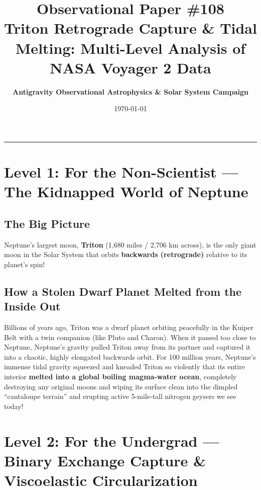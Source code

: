 \documentclass[11pt,a4paper]{article}
\title{\Huge \textbf{Observational Paper \#108}\\ \Large Triton Retrograde Capture \& Tidal Melting: Multi-Level Analysis of NASA Voyager 2 Data}
\author{\textbf{Antigravity Observational Astrophysics \& Solar System Campaign}}
\date{\today}
\begin{document}
\maketitle

\vspace{-1em}
\begin{center}
\rule{\textwidth}{1.5pt}
\end{center}

\section*{Level 1: For the Non-Scientist — The Kidnapped World of Neptune}

\subsection*{The Big Picture}
Neptune's largest moon, \textbf{Triton} (1,680 miles / 2,706 km across), is the only giant moon in the Solar System that orbits \textbf{backwards (retrograde)} relative to its planet's spin!

\subsection*{How a Stolen Dwarf Planet Melted from the Inside Out}
Billions of years ago, Triton was a dwarf planet orbiting peacefully in the Kuiper Belt with a twin companion (like Pluto and Charon). When it passed too close to Neptune, Neptune's gravity pulled Triton away from its partner and captured it into a chaotic, highly elongated backwards orbit. For 100 million years, Neptune's immense tidal gravity squeezed and kneaded Triton so violently that its entire interior \textbf{melted into a global boiling magma-water ocean}, completely destroying any original moons and wiping its surface clean into the dimpled ``cantaloupe terrain'' and erupting active 5-mile-tall nitrogen geysers we see today!

\newpage

\section*{Level 2: For the Undergrad — Binary Exchange Capture \& Viscoelastic Circularization}
\end{document}
